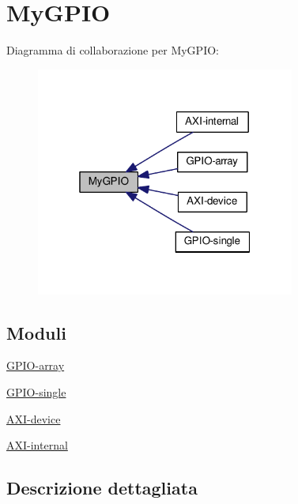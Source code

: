 \hypertarget{group__my_g_p_i_o}{\section{My\+G\+P\+I\+O}
\label{group__my_g_p_i_o}
}
Diagramma di collaborazione per My\+G\+P\+I\+O\+:\nopagebreak
\begin{figure}[H]
\begin{center}
\leavevmode
\includegraphics[width=241pt]{group__my_g_p_i_o}
\end{center}
\end{figure}
\subsection*{Moduli}
\begin{DoxyCompactItemize}
\item 
\hyperlink{group___g_p_i_o-array}{G\+P\+I\+O-\/array}
\item 
\hyperlink{group___g_p_i_o-single}{G\+P\+I\+O-\/single}
\item 
\hyperlink{group___a_x_i-device}{A\+X\+I-\/device}
\item 
\hyperlink{group___a_x_i-internal}{A\+X\+I-\/internal}
\end{DoxyCompactItemize}


\subsection{Descrizione dettagliata}
